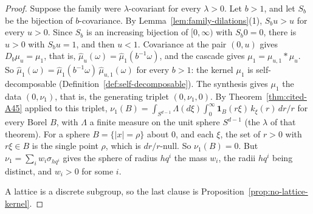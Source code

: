 \begin{proof}
Suppose the family were $\lambda$-covariant for every $\lambda > 0$. Let $b > 1$, and let $S_b$ be
the bijection of $b$-covariance. By Lemma~\ref{lem:family-dilations}(1), $S_bu > u$ for every
$u > 0$. Since $S_b$ is an increasing bijection of $[0,\infty)$ with $S_b0 = 0$, there is $u > 0$ with
$S_bu = 1$, and then $u < 1$. Covariance at the pair $(0, u)$ gives $D_b\mu_u = \mu_1$, that is,
$\widehat\mu_u(\omega) = \widehat\mu_1(b^{-1}\omega)$, and the cascade gives
$\mu_1 = \mu_{u,1} * \mu_u$. So $\widehat\mu_1(\omega) = \widehat\mu_1(b^{-1}\omega)\,\widehat\mu_{u,1}(\omega)$
for every $b > 1$: the kernel $\mu_1$ is self-decomposable (Definition~\ref{def:self-decomposable}).
The synthesis gives $\mu_1$ the data $(0, \nu_1)$, that is, the generating triplet
$(0, \nu_1, 0)$. By Theorem~\ref{thm:cited-A45} applied to this triplet,
$\nu_1(B) = \int_{S^{d-1}}\Lambda(d\xi)\int_0^\infty\mathbf 1_B(r\xi)\,k_\xi(r)\,dr/r$ for every
Borel $B$, with $\Lambda$ a finite measure on the unit sphere $S^{d-1}$ (the $\lambda$ of that
theorem). For a sphere
$B = \{|x| = \rho\}$ about $0$, and each $\xi$, the set of $r > 0$ with $r\xi \in B$ is the single
point $\rho$, which is $dr/r$-null. So $\nu_1(B) = 0$. But
$\nu_1 = \sum_iw_i\sigma_{hq^i}$ gives the sphere of radius $hq^i$ the mass $w_i$, the radii $hq^i$
being distinct, and $w_i > 0$ for some $i$.

A lattice is a discrete subgroup, so the last clause is Proposition~\ref{prop:no-lattice-kernel}.
\end{proof}

